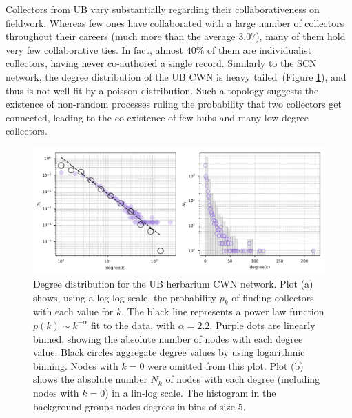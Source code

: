 Collectors from UB vary substantially regarding their collaborativeness on fieldwork.
Whereas few ones have collaborated with a large number of collectors throughout their careers (much more than the average $3.07$), many of them hold very few collaborative ties.
In fact, almost $40\%$ of them are individualist collectors, having never co-authored a single record.
%
Similarly to the SCN network, the degree distribution of the UB CWN is heavy tailed~(Figure \ref{fig:ub_cwn_degree_dist}), and thus is not well fit by a poisson distribution.
Such a topology suggests the existence of non-random processes ruling the probability that two collectors get connected, leading to the co-existence of few hubs and many low-degree collectors.
\begin{figure}[!ht]
  	\centering
    \includegraphics[width=\linewidth]{figures/casestudy_ub/cwn_degree_dist.pdf}
    \caption[Degree distribution for the UB CWN.]{ Degree distribution for the UB herbarium CWN network. Plot (a) shows, using a log-log scale, the probability $p_k$ of finding collectors with each value for $k$. The black line represents a power law function $p(k) \sim k^{-\alpha}$ fit to the data, with $\alpha=2.2$. Purple dots are linearly binned, showing the absolute number of nodes with each degree value. Black circles aggregate degree values by using logarithmic binning. Nodes with $k=0$ were omitted from this plot. Plot (b) shows the absolute number $N_k$ of nodes with each degree (including nodes with $k=0$) in a lin-log scale. The histogram in the background groups nodes degrees in bins of size $5$. }
    \label{fig:ub_cwn_degree_dist}
\end{figure}


